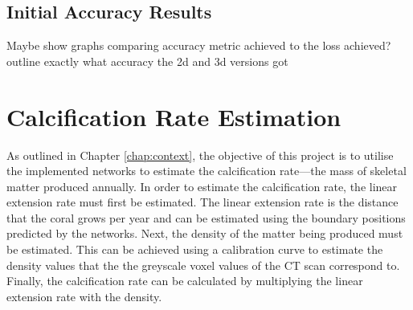 \subsection{Initial Accuracy Results}

Maybe show graphs comparing accuracy metric achieved to the loss achieved? outline exactly what accuracy the 2d and 3d versions got

\section{Calcification Rate Estimation}
\label{sec:calcificationimplementation}

As outlined in Chapter \ref{chap:context}, the objective of this project is to utilise the implemented networks to estimate the calcification rate---the mass of skeletal matter produced annually. In order to estimate the calcification rate, the linear extension rate must first be estimated. The linear extension rate is the distance that the coral grows per year and can be estimated using the boundary positions predicted by the networks. Next, the density of the matter being produced must be estimated. This can be achieved using a calibration curve to estimate the density values that the the greyscale voxel values of the CT scan correspond to. Finally, the calcification rate can be calculated by multiplying the linear extension rate with the density.





